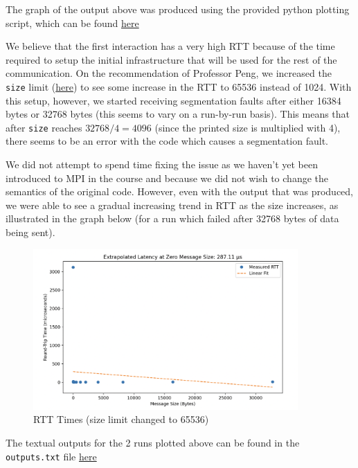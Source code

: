 \documentclass[a4paper,10pt]{article}
\begin{document}
The graph of the output above was produced using the provided python plotting script, which can be found \href{https://github.com/paulmyr/DD2356-MethodsHPC/blob/master/2_hpc_arch_perf_model/bonus/graph_latency.py}{here}

We believe that the first interaction has a very high RTT because of the time required to setup the initial infrastructure that will be used for the rest of the communication. On the recommendation of Professor Peng, we increased the \verb|size| limit (\href{https://github.com/paulmyr/DD2356-MethodsHPC/blob/master/2_hpc_arch_perf_model/bonus/mpi_ping_pong.c#L14}{here}) to see some increase in the RTT to 65536 instead of 1024. With this setup, however, we started receiving segmentation faults after either 16384 bytes or 32768 bytes (this seems to vary on a run-by-run basis). This means that after \verb|size| reaches $32768 / 4 = 4096$ (since the printed size is multiplied with 4), there seems to be an error with the code which causes a segmentation fault. 

We did not attempt to spend time fixing the issue as we haven't yet been introduced to MPI in the course and because we did not wish to change the semantics of the original code. However, even with the output that was produced, we were able to see a gradual increasing trend in RTT as the size increases, as illustrated in the graph below (for a run which failed after 32768 bytes of data being sent). 

  \begin{figure}[H]
    \centering
    \includegraphics[width=0.9\textwidth]{img/bonus_lim65536}
    \caption{RTT Times (size limit changed to 65536)}
    \label{fig:bonus_rtt_large}
  \end{figure}

The textual outputs for the 2 runs plotted above can be found in the \verb|outputs.txt| file \href{https://github.com/paulmyr/DD2356-MethodsHPC/blob/master/2_hpc_arch_perf_model/bonus/outputs.txt}{here}
\end{document}
